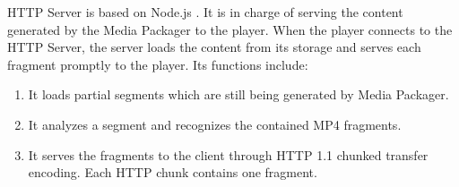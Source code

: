 HTTP Server is based on Node.js \cite{nodejs}. It is in charge of serving the content generated by the Media Packager to the player. When the player connects to the HTTP Server, the server loads the content from its storage and serves each fragment promptly to the player. Its functions include:
\begin{enumerate}
	\item It loads partial segments which are still being generated by Media Packager.
	\item It analyzes a segment and recognizes the contained MP4 fragments.
	\item It serves the fragments to the client through HTTP 1.1 chunked transfer encoding. Each HTTP chunk contains one fragment.
\end{enumerate}

